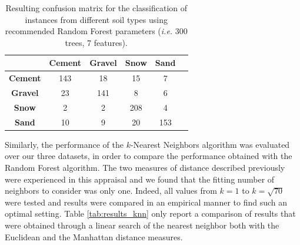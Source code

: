 \documentclass[conference]{IEEEtran}
\begin{document}
\begin{table}[!ht]
  \centering
  \caption{Resulting confusion matrix for the classification of instances from different soil types using recommended Random Forest parameters (\textit{i.e.} 300 trees, 7 features).}
  \label{tab:conf_mat}
  \begin{tabular}{cccccc}
    \toprule
    &\textbf{Cement}&\textbf{Gravel}&\textbf{Snow}&\textbf{Sand}\\
    \midrule
   	\textbf{Cement}&143&18&15&7\\
    \textbf{Gravel}&23&141&8&6\\
    \textbf{Snow}&2&2&208&4\\
    \textbf{Sand}&10&9&20&153\\
    \bottomrule
\end{tabular}
\end{table}





Similarly, the performance of the $k$-Nearest Neighbors algorithm was evaluated over our three datasets, in order to compare the performance obtained with the Random Forest algorithm. The two measures of distance described previously were experienced in this appraisal and we found that the fitting number of neighbors to consider was only one. Indeed, all values from $k=1$ to $k=\sqrt{70}$ were tested and results were compared in an empirical manner to find such an optimal setting. Table \ref{tab:results_knn} only report a comparison of results that were obtained through a linear search of the nearest neighbor both with the Euclidean and the Manhattan distance measures.
\end{document}
